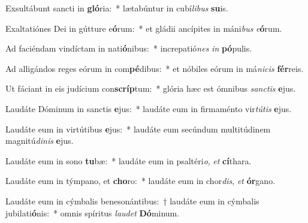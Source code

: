 \item Exsultábunt sancti in \textbf{gló}ria:~* lætabúntur in cubí\textit{li}\textit{bus} \textbf{su}is.
\item Exaltatiónes Dei in gútture e\textbf{ó}rum:~* et gládii ancípites in máni\textit{bus} \textit{e}\textbf{ó}rum.
\item Ad faciéndam vindíctam in nati\textbf{ó}nibus:~* increpatió\textit{nes} \textit{in} \textbf{pó}pulis.
\item Ad alligándos reges eórum in com\textbf{pé}dibus:~* et nóbiles eórum in má\textit{ni}\textit{cis} \textbf{fér}reis.
\item Ut fáciant in eis judícium con\textbf{scríp}tum:~* glória hæc est ómnibus \textit{sanc}\textit{tis} \textbf{e}jus.
\item Laudáte Dóminum in sanctis \textbf{e}jus:~* laudáte eum in firmaménto vir\textit{tú}\textit{tis} \textbf{e}jus.
\item Laudáte eum in virtútibus \textbf{e}jus:~* laudáte eum secúndum multitúdinem magnitú\textit{di}\textit{nis} \textbf{e}jus.
\item Laudáte eum in sono \textbf{tu}bæ:~* laudáte eum in psaltéri\textit{o}, \textit{et} \textbf{cí}thara.
\item Laudáte eum in týmpano, et \textbf{cho}ro:~* laudáte eum in chor\textit{dis}, \textit{et} \textbf{ór}gano.
\item Laudáte eum in cýmbalis benesonántibus:~† laudáte eum in cýmbalis jubilati\textbf{ó}nis:~* omnis spíritus \textit{lau}\textit{det} \textbf{Dó}minum.
